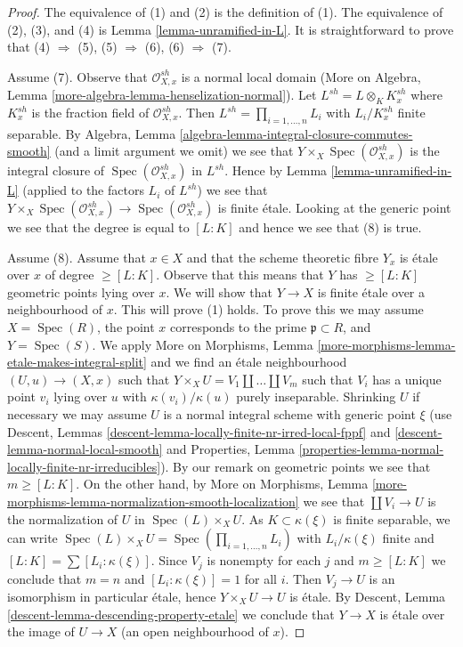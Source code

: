 \documentclass{stacks-project}
\theoremstyle{plain}
\theoremstyle{definition}
\theoremstyle{remark}
\numberwithin{equation}{subsection}
\def\Spec{\mathop{\mathrm{Spec}}}
\begin{document}
\begin{proof}
The equivalence of (1) and (2) is the definition of (1).
The equivalence of (2), (3), and (4) is Lemma \ref{lemma-unramified-in-L}.
It is straightforward to prove that (4) $\Rightarrow$ (5),
(5) $\Rightarrow$ (6), (6) $\Rightarrow$ (7).

\medskip\noindent
Assume (7). Observe that $\mathcal{O}_{X, x}^{sh}$ is a normal local domain
(More on Algebra, Lemma \ref{more-algebra-lemma-henselization-normal}).
Let $L^{sh} = L \otimes_K K_x^{sh}$ where $K_x^{sh}$ is the fraction field
of $\mathcal{O}_{X, x}^{sh}$. Then $L^{sh} = \prod_{i = 1, \ldots, n} L_i$
with $L_i/K_x^{sh}$ finite separable. By
Algebra, Lemma \ref{algebra-lemma-integral-closure-commutes-smooth}
(and a limit argument we omit)
we see that $Y \times_X \Spec(\mathcal{O}_{X, x}^{sh})$
is the integral closure of $\Spec(\mathcal{O}_{X, x}^{sh})$ in $L^{sh}$.
Hence by Lemma \ref{lemma-unramified-in-L} (applied to the factors
$L_i$ of $L^{sh}$) we see that
$Y \times_X \Spec(\mathcal{O}_{X, x}^{sh}) \to \Spec(\mathcal{O}_{X, x}^{sh})$
is finite \'etale. Looking at the generic point we see that
the degree is equal to $[L : K]$ and hence we see that (8) is true.

\medskip\noindent
Assume (8). Assume that $x \in X$ and that the scheme theoretic fibre $Y_x$
is \'etale over $x$ of degree $\geq [L : K]$. Observe that this means
that $Y$ has $\geq [L : K]$ geometric points lying over $x$.
We will show that $Y \to X$ is finite \'etale over a neighbourhood of $x$.
This will prove (1) holds.
To prove this we may assume $X = \Spec(R)$, the point $x$ corresponds to
the prime $\mathfrak p \subset R$, and $Y = \Spec(S)$. We apply
More on Morphisms,
Lemma \ref{more-morphisms-lemma-etale-makes-integral-split} and we find an
\'etale neighbourhood $(U, u) \to (X, x)$ such that
$Y \times_X U = V_1 \amalg \ldots \amalg V_m$ such that $V_i$
has a unique point $v_i$ lying over $u$ with $\kappa(v_i)/\kappa(u)$
purely inseparable. Shrinking $U$ if necessary we may assume $U$ is
a normal integral scheme with generic point $\xi$ (use
Descent, Lemmas \ref{descent-lemma-locally-finite-nr-irred-local-fppf} and
\ref{descent-lemma-normal-local-smooth} and
Properties, Lemma \ref{properties-lemma-normal-locally-finite-nr-irreducibles}).
By our remark on geometric points we see that $m \geq [L : K]$.
On the other hand, by More on Morphisms, Lemma
\ref{more-morphisms-lemma-normalization-smooth-localization}
we see that $\coprod V_i \to U$ is the normalization of $U$ in
$\Spec(L) \times_X U$. As $K \subset \kappa(\xi)$ is finite separable,
we can write $\Spec(L) \times_X U = \Spec(\prod_{i = 1, \ldots, n} L_i)$
with $L_i/\kappa(\xi)$ finite and $[L : K] = \sum [L_i : \kappa(\xi)]$.
Since $V_j$ is nonempty for each $j$ and $m \geq [L : K]$
we conclude that $m = n$ and $[L_i : \kappa(\xi)] = 1$
for all $i$. Then $V_j \to U$ is an isomorphism in particular
\'etale, hence $Y \times_X U \to U$ is \'etale. By
Descent, Lemma \ref{descent-lemma-descending-property-etale}
we conclude that $Y \to X$ is \'etale over the
image of $U \to X$ (an open neighbourhood of $x$).


\end{proof}
\end{document}
